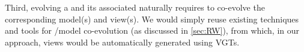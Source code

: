 Third, evolving a \metamodel and its associated \viewtypes naturally requires to
co-evolve the corresponding 
model(s) and view(s). We would simply reuse existing 
techniques and tools for \metamodel/model co-evolution (as discussed in \cref{sec:RW}),
from which, in our approach, views would be automatically generated using VGTs.

